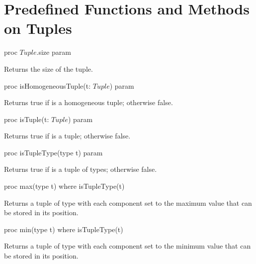 \section{Predefined Functions and Methods on Tuples}

\begin{protohead}
proc $Tuple$.size param
\end{protohead}
\begin{protobody}
Returns the size of the tuple.
\end{protobody}

\begin{protohead}
proc isHomogeneousTuple(t: $Tuple$) param
\end{protohead}
\begin{protobody}
Returns true if  is a homogeneous tuple; otherwise false.
\end{protobody}

\begin{protohead}
proc isTuple(t: $Tuple$) param
\end{protohead}
\begin{protobody}
Returns true if  is a tuple; otherwise false.
\end{protobody}

\begin{protohead}
proc isTupleType(type t) param
\end{protohead}
\begin{protobody}
Returns true if  is a tuple of types; otherwise false.
\end{protobody}

\begin{protohead}
proc max(type t) where isTupleType(t)
\end{protohead}
\begin{protobody}
Returns a tuple of type  with each component set to the maximum
value that can be stored in its position.
\end{protobody}

\begin{protohead}
proc min(type t) where isTupleType(t)
\end{protohead}
\begin{protobody}
Returns a tuple of type  with each component set to the minimum
value that can be stored in its position.
\end{protobody}


